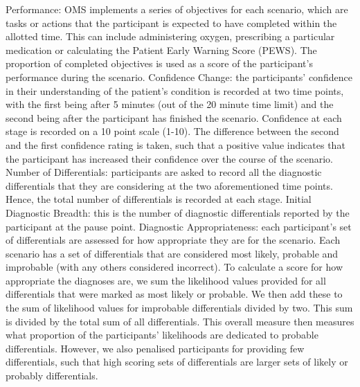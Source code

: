\documentclass[a4paper, nobind]{templates/ociamthesis}
\begin{document}
Performance: OMS implements a series of objectives for each scenario, which are tasks or actions that the participant is expected to have completed within the allotted time. This can include administering oxygen, prescribing a particular medication or calculating the Patient Early Warning Score (PEWS). The proportion of completed objectives is used as a score of the participant's performance during the scenario.
Confidence Change: the participants' confidence in their understanding of the patient's condition is recorded at two time points, with the first being after 5 minutes (out of the 20 minute time limit) and the second being after the participant has finished the scenario. Confidence at each stage is recorded on a 10 point scale (1-10). The difference between the second and the first confidence rating is taken, such that a positive value indicates that the participant has increased their confidence over the course of the scenario.
Number of Differentials: participants are asked to record all the diagnostic differentials that they are considering at the two aforementioned time points. Hence, the total number of differentials is recorded at each stage.
Initial Diagnostic Breadth: this is the number of diagnostic differentials reported by the participant at the pause point.
Diagnostic Appropriateness: each participant's set of differentials are assessed for how appropriate they are for the scenario. Each scenario has a set of differentials that are considered most likely, probable and improbable (with any others considered incorrect). To calculate a score for how appropriate the diagnoses are, we sum the likelihood values provided for all differentials that were marked as most likely or probable. We then add these to the sum of likelihood values for improbable differentials divided by two. This sum is divided by the total sum of all differentials. This overall measure then measures what proportion of the participants' likelihoods are dedicated to probable differentials. However, we also penalised participants for providing few differentials, such that high scoring sets of differentials are larger sets of likely or probably differentials.
\end{document}
